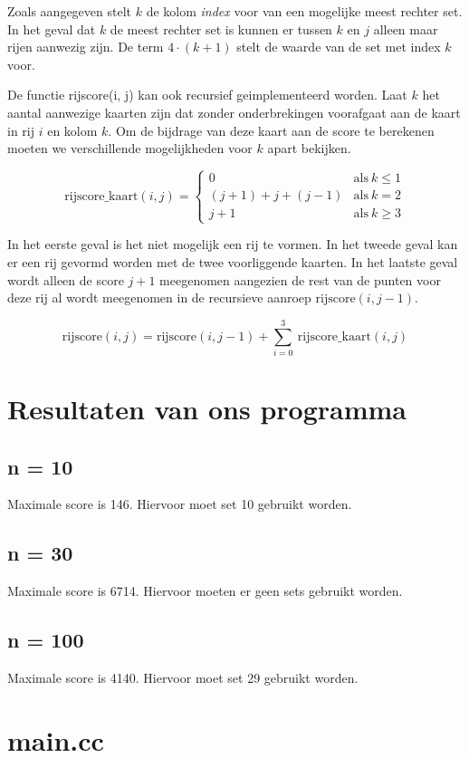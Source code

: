 \documentclass{article}
\begin{document}
Zoals aangegeven stelt $k$ de kolom \emph{index} voor van een mogelijke meest rechter set. In het geval dat $k$ de meest rechter set is kunnen er tussen $k$ en $j$ alleen maar rijen aanwezig zijn. De term $4 \cdot (k + 1)$ stelt de waarde van de set met index $k$ voor. 

De functie rijscore(i, j) kan ook recursief geimplementeerd worden. Laat $k$ het aantal aanwezige kaarten zijn dat zonder onderbrekingen voorafgaat aan de kaart in rij $i$ en kolom $k$. Om de bijdrage van deze kaart aan de score te berekenen moeten we verschillende mogelijkheden voor $k$ apart bekijken.

$$
\text{rijscore\_kaart}(i, j) = \begin{cases}
    0 & \text{als} \ k \le 1 \\
    (j + 1) + j + (j - 1) & \text{als} \  k = 2 \\
    j + 1 & \text{als} \  k \ge 3
\end{cases}
$$

In het eerste geval is het niet mogelijk een rij te vormen. In het tweede geval kan er een rij gevormd worden met de twee voorliggende kaarten. In het laatste geval wordt alleen de score $j + 1$ meegenomen aangezien de rest van de punten voor deze rij al wordt meegenomen in de recursieve aanroep $\text{rijscore}(i, j - 1)$.

$$
\text{rijscore}(i, j) = \text{rijscore}(i, j - 1) + \sum_{i = 0}^{3} \  \text{rijscore\_kaart}(i, j)
$$


\section{Resultaten van ons programma}

\subsection{n = 10}

Maximale score is 146. Hiervoor moet set 10 gebruikt worden.



\subsection{n = 30}

Maximale score is 6714. Hiervoor moeten er geen sets gebruikt worden.



\subsection{n = 100}

Maximale score is 4140. Hiervoor moet set 29 gebruikt worden.



\section{main.cc}


\end{document}
